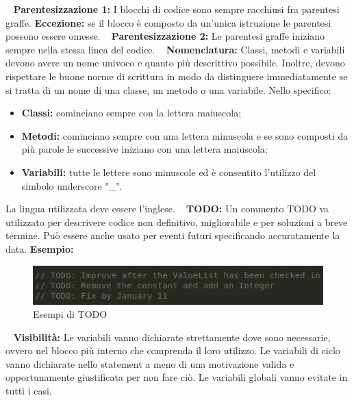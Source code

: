 ~\newline	
	\textbf{Parentesizzazione 1:} I blocchi di codice sono sempre racchiusi fra parentesi graffe.\newline 
	\textbf{Eccezione:} se il blocco è composto da un'unica istruzione le parentesi possono essere omesse.\newline
	~\newline
	\textbf{Parentesizzazione 2:} Le parentesi graffe iniziano sempre nella stessa linea del codice. \newline
	~\newline
	\textbf{Nomenclatura:} Classi, metodi e variabili devono avere un nome univoco e quanto più descrittivo possibile. Inoltre, devono rispettare le buone norme di scrittura in modo da distinguere immediatamente se si tratta di un nome di una classe, un metodo o una variabile. Nello specifico:\newline
	\begin{itemize}
	\item \textbf{Classi:} cominciano sempre con la lettera maiuscola;
	\item \textbf{Metodi:} cominciano sempre con una lettera minuscola e se sono composti da più parole le successive iniziano con una lettera maiuscola;
	\item \textbf{Variabili:} tutte le lettere sono minuscole ed è consentito l'utilizzo del simbolo underscore "\_".\newline
	\end{itemize}
	La lingua utilizzata deve essere l'inglese.\newline
	~\newline
	\textbf{TODO:} Un commento TODO va utilizzato per descrivere codice non definitivo, migliorabile e per soluzioni a breve termine. Può essere anche usato per eventi futuri specificando accuratamente la data.\newline
	\textbf{Esempio:}\newline
	\begin{figure}[!htbp]
		\centering
		\includegraphics{todo.png}
		\caption{Esempi di TODO}
	\end{figure}
	~\newline
	\textbf{Visibilità:} Le variabili vanno dichiarate strettamente dove sono necessarie, ovvero nel blocco più interno che comprenda il loro utilizzo. Le variabili di ciclo vanno dichiarate nello statement a meno di una motivazione valida e opportunamente giustificata per non fare ciò. Le variabili globali vanno evitate in tutti i casi.\newline
